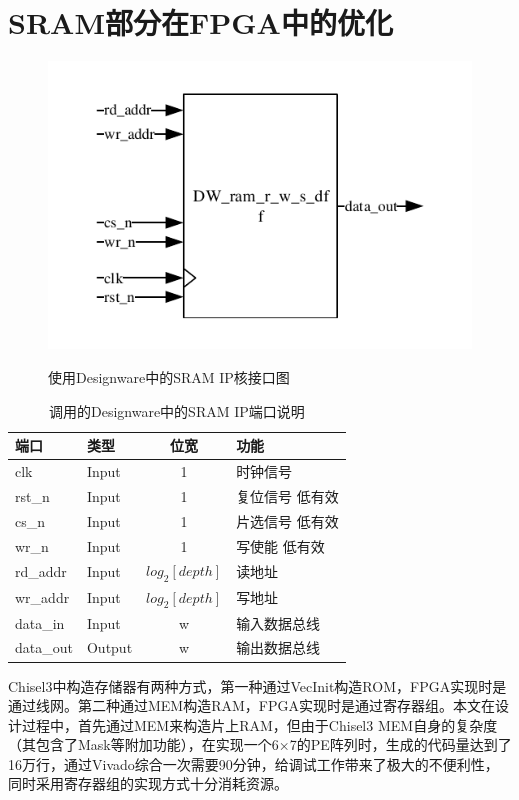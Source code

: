 \section{SRAM部分在FPGA中的优化}
\begin{figure}[h]
    \centering
    \includegraphics{../pdf/sram.pdf}\\
    \caption{使用Designware中的SRAM IP核接口图}
\end{figure}
\begin{table}[h] %
    \centering
    \caption{调用的Designware中的SRAM IP端口说明} %
    \begin{tabular}{l|l|c|l} %
    \hline  
    \hline  
    端口 & 类型 & 位宽 & 功能 \\ %
    \hline %
    clk & Input & 1 & 时钟信号 \\  
    \hline  
    rst\_n & Input & 1 & 复位信号 低有效 \\  
    \hline  
    cs\_n & Input & 1 & 片选信号 低有效 \\  
    \hline  
    wr\_n & Input & 1 & 写使能 低有效\\  
    \hline  
    rd\_addr & Input & $log_2[depth]$ & 读地址 \\  
    \hline  
    wr\_addr & Input & $log_2[depth]$ & 写地址 \\  
    \hline  
    data\_in & Input & w & 输入数据总线\\  
    \hline  
    data\_out & Output & w & 输出数据总线\\  
    \hline  
    \hline  
    \end{tabular}  
\end{table}  
Chisel3中构造存储器有两种方式，第一种通过VecInit构造ROM，FPGA实现时是通过线网。第二种通过MEM构造RAM，FPGA实现时是通过寄存器组。本文在设计过程中，首先通过MEM来构造片上RAM，但由于Chisel3 MEM自身的复杂度（其包含了Mask等附加功能），在实现一个6×7的PE阵列时，生成的代码量达到了16万行，通过Vivado综合一次需要90分钟，给调试工作带来了极大的不便利性，同时采用寄存器组的实现方式十分消耗资源。

